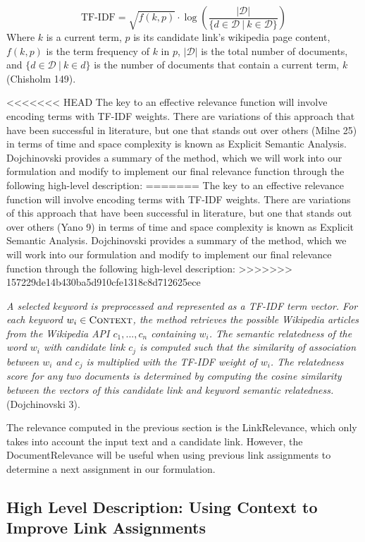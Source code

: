 \documentclass[twoside,11pt]{article}
\begin{document}
$$\mbox{TF-IDF} = \sqrt{f(k, p)} \cdot \log \left( \frac{|\mathcal{D}|}{\{d \in \mathcal{D} \ | \ k \in \mathcal{D}\}} \right) $$
Where $k$ is a current term, $p$ is its candidate link's wikipedia page content, $f(k,p)$ is the term frequency of $k$ in $p$, $|\mathcal{D}|$ is the total number of documents, and $\{d \in \mathcal{D} \ | \ k \in d\}$ is the number of documents that contain a current term, $k$ (Chisholm 149).

<<<<<<< HEAD
The key to an effective relevance function will involve encoding terms with TF-IDF weights. There are variations of this approach that have been successful in literature, but one that stands out over others (Milne 25) in terms of time and space complexity is known as Explicit Semantic Analysis. Dojchinovski provides a summary of the method, which we will work into our formulation and modify to implement our final relevance function through the following high-level description:
=======
The key to an effective relevance function will involve encoding terms with TF-IDF weights. There are variations of this approach that have been successful in literature, but one that stands out over others (Yano 9) in terms of time and space complexity is known as Explicit Semantic Analysis. Dojchinovski provides a summary of the method, which we will work into our formulation and modify to implement our final relevance function through the following high-level description:
>>>>>>> 157229de14b430ba5d910cfe1318c8d712625ece

\textit{A selected keyword is preprocessed and represented as a TF-IDF term vector. For each keyword $w_i \in \mbox{\sc Context}$, the method retrieves the possible Wikipedia articles from the Wikipedia API $c_1,... ,c_n$ containing $w_i$. The semantic relatedness of the word $w_i$ with candidate link $c_j$ is computed such that the similarity of association between $w_i$ and $c_j$ is multiplied with the TF-IDF weight of $w_i$. The relatedness score for any two documents is determined by computing the cosine similarity between the vectors of this candidate link and keyword semantic relatedness.} (Dojchinovski 3).

The relevance computed in the previous section is the {\sc LinkRelevance}, which only takes into account the input text and a candidate link. However, the {\sc DocumentRelevance} will be useful when using previous link assignments to determine a next assignment in our formulation.


\subsection{High Level Description: Using Context to Improve Link Assignments}
\end{document}
